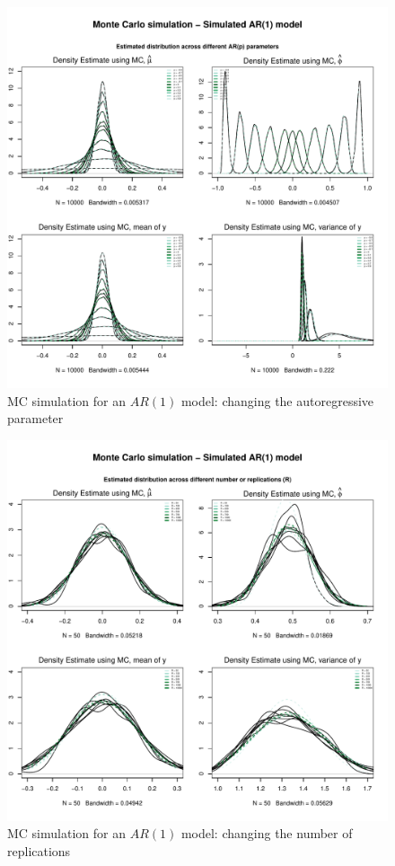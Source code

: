 \documentclass{article}
\begin{document}
\begin{figure}[hbt!]
\includegraphics[width=\textwidth]{plots/MC_AR1_densities_diff_ARq}
\caption{MC simulation for an $AR(1)$ model: changing the autoregressive parameter}
\label{fig:MC_AR1_densities_diff_ARq}
\centering
\end{figure}

\begin{figure}[hbt!]
\includegraphics[width=\textwidth]{plots/MC_AR1_densities_diff_norepl}
\caption{MC simulation for an $AR(1)$ model: changing the number of replications}
\label{fig:MC_AR1_densities_diff_norepl}
\centering
\end{figure}
\end{document}
